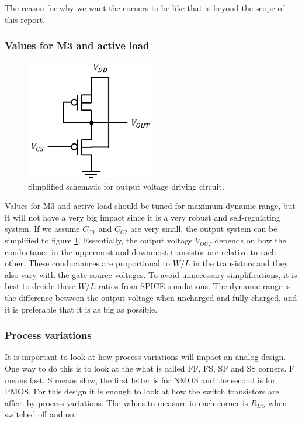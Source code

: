 The reason for why we want the corners to be like that is beyond the scope of this report.

\subsubsection{Values for M3 and active load}

\begin{figure}[H]
    \centering
    \includegraphics[width=0.5\textwidth]{graphs/m3AndActiveLoad.png}
    \caption{Simplified schematic for output voltage driving circuit.}
    \label{fig:m3AndActiveLoad}
\end{figure}

Values for M3 and active load should be tuned for maximum dynamic range, but it will not have a very big impact since it is a very robust and self-regulating system. If we assume $C_{C1}$ and $C_{C2}$ are very small, the output system can be simplified to figure \ref{fig:m3AndActiveLoad}. Essentially, the output voltage $V_{OUT}$ depends on how the conductance in the uppermost and downmost transistor are relative to each other. These conductances are proportional to $W/L$ in the transistors and they also vary with the gate-source voltages. To avoid unnecessary simplifications, it is best to decide these $W/L$-ratios from SPICE-simulations. The dynamic range is the difference between the output voltage when uncharged and fully charged, and it is preferable that it is as big as possible.

\subsubsection{Process variations}

It is important to look at how process variations will impact an analog design. One way to do this is to look at the what is called FF, FS, SF and SS corners. F means fast, S means slow, the first letter is for NMOS and the second is for PMOS. For this design it is enough to look at how the switch transistors are affect by process variations. The values to measure in each corner is $R_{DS}$ when switched off and on.


